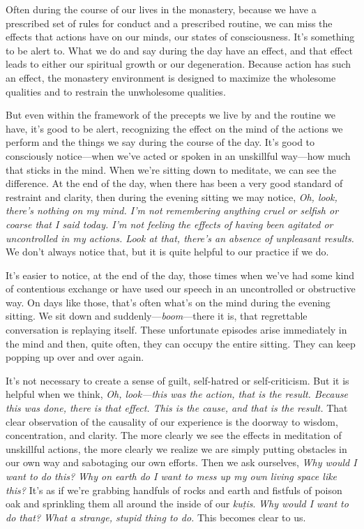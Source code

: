 Often during the course of our lives in the monastery, because we have 
a prescribed set of rules for conduct and a prescribed routine, we can 
miss the effects that actions have on our minds, our states of 
consciousness. It's something to be alert to. What we do and say during 
the day have an effect, and that effect leads to either our spiritual 
growth or our degeneration. Because action has such an effect, the 
monastery environment is designed to maximize the wholesome qualities 
and to restrain the unwholesome qualities.

But even within the framework of the precepts we live by and the 
routine we have, it's good to be alert, recognizing the effect on the 
mind of the actions we perform and the things we say during the course 
of the day. It's good to consciously notice---when we've acted or 
spoken in an unskillful way---how much that sticks in the mind. When 
we're sitting down to meditate, we can see the difference. At the end 
of the day, when there has been a very good standard of restraint and 
clarity, then during the evening sitting we may notice, \emph{Oh, look, 
there's nothing on my mind. I'm not remembering anything cruel or 
selfish or coarse that I said today. I'm not feeling the effects of 
having been agitated or uncontrolled in my actions. Look at that, 
there's an absence of unpleasant results.} We don't always notice that, 
but it is quite helpful to our practice if we do.

It's easier to notice, at the end of the day, those times when we've 
had some kind of contentious exchange or have used our speech in an 
uncontrolled or obstructive way. On days like those, that's often 
what's on the mind during the evening sitting. We sit down and 
suddenly---\emph{boom}---there it is, that regrettable conversation is 
replaying itself. These unfortunate episodes arise immediately in the 
mind and then, quite often, they can occupy the entire sitting. They 
can keep popping up over and over again.

It's not necessary to create a sense of guilt, self-hatred or 
self-criticism. But it is helpful when we think, \emph{Oh, look---this 
was the action, that is the result. Because this was done, there is 
that effect. This is the cause, and that is the result.} That clear 
observation of the causality of our experience is the doorway to 
wisdom, concentration, and clarity. The more clearly we see the effects 
in meditation of unskillful actions, the more clearly we realize we are 
simply putting obstacles in our own way and sabotaging our own efforts. 
Then we ask ourselves, \emph{Why would I want to do this? Why on earth 
do I want to mess up my own living space like this?} It's as if we're 
grabbing handfuls of rocks and earth and fistfuls of poison oak and 
sprinkling them all around the inside of our \emph{kuṭis}. \emph{Why 
would I want to do that? What a strange, stupid thing to do.} This 
becomes clear to us.

